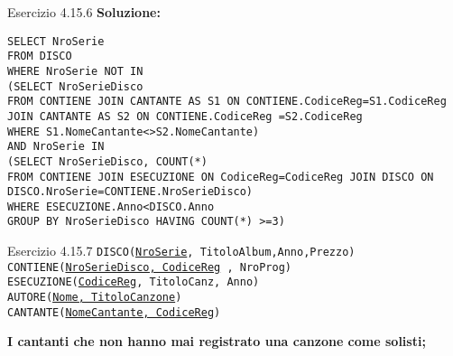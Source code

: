 \begin{frame}{Esercizio 4.15.6}
    \textbf{Soluzione:}
    \vspace{1em}
    
    \texttt{SELECT NroSerie\\FROM DISCO\\WHERE NroSerie NOT IN\\(SELECT NroSerieDisco\\FROM CONTIENE JOIN CANTANTE AS S1 ON CONTIENE.CodiceReg=S1.CodiceReg\\JOIN CANTANTE AS S2 ON CONTIENE.CodiceReg =S2.CodiceReg\\WHERE S1.NomeCantante<>S2.NomeCantante)\\AND NroSerie IN\\(SELECT NroSerieDisco, COUNT(*)\\FROM CONTIENE JOIN ESECUZIONE ON CodiceReg=CodiceReg JOIN DISCO ON
DISCO.NroSerie=CONTIENE.NroSerieDisco)\\WHERE ESECUZIONE.Anno<DISCO.Anno
\\GROUP BY NroSerieDisco
HAVING COUNT(*) >=3)}
    \end{frame}
\begin{frame}{Esercizio 4.15.7}
    \texttt{DISCO(\underline{NroSerie}, TitoloAlbum,Anno,Prezzo)\\
    CONTIENE(\underline{NroSerieDisco, CodiceReg} , NroProg)\\
    ESECUZIONE(\underline{CodiceReg}, TitoloCanz, Anno)\\
    AUTORE(\underline{Nome, TitoloCanzone})\\
    CANTANTE(\underline{NomeCantante, CodiceReg})}
    \vspace{1em}
    
    \textbf{I cantanti che non hanno mai registrato una canzone come solisti;}
\end{frame}

